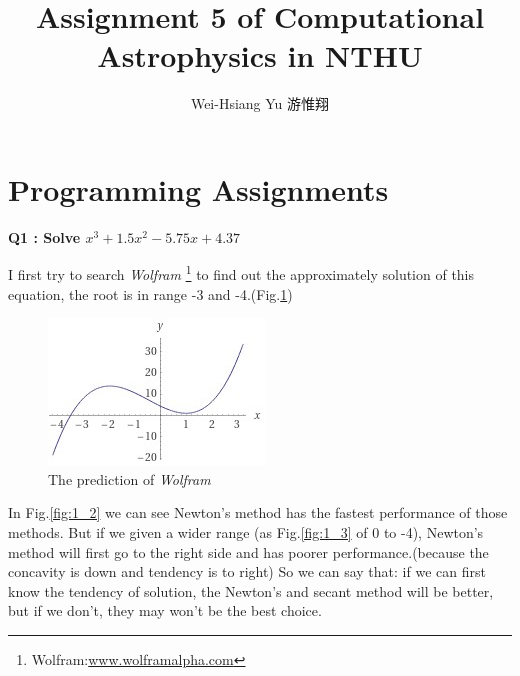 \documentclass{article}
\title{Assignment 5 of Computational Astrophysics in NTHU}
\author{Wei-Hsiang Yu 游惟翔}
\begin{document}
\begin{CJK}{UTF8}{bsmi}
\maketitle
\end{CJK}



\section{Programming Assignments}
\textbf{Q1 : Solve $x^3+1.5x^2-5.75x+4.37$\\}

I first try to search \emph{Wolfram}
\footnote{Wolfram:\href{www.wolframalpha.com}{www.wolframalpha.com}}
to find out the approximately solution of this equation, the root is in range -3 and -4.(Fig.\ref{fig:1_1})
\begin{figure}[h]
    \centering 
	\includegraphics[scale=0.75]{pro1.jpg}
	\caption{The prediction of \emph{Wolfram}}%
	\label{fig:1_1} %
\end{figure}

In Fig.\ref{fig:1_2} we can see Newton's method has the fastest performance of those methods.  But if we given a wider range (as Fig.\ref{fig:1_3} of 0 to -4), Newton's method will first go to the right side and has poorer performance.(because the concavity is down and tendency is to right) So we can say that: if we can first know the tendency of solution, the Newton's and secant method will be better, but if we don't, they may won't be the best choice.
\end{document}
